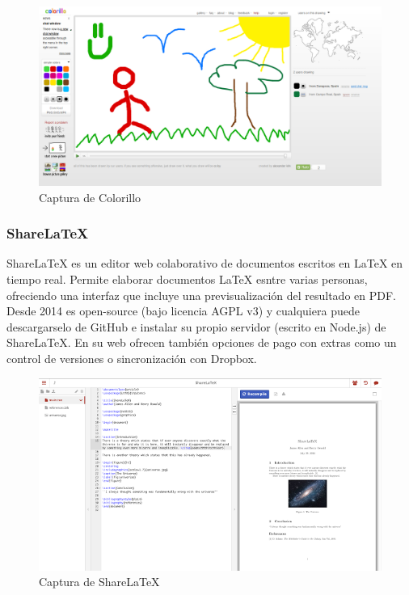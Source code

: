 	\begin{figure}[H]
		\centering
			\includegraphics[keepaspectratio, scale=0.30]{Media/Captures/colorilloWeb.png}
		\caption{Captura de Colorillo}
		\label{fig:colorillo}
	\end{figure}  	
	
	\subsubsection{ShareLaTeX}
	
	ShareLaTeX \cite{ref:shareLatex} es un editor web colaborativo de documentos escritos en LaTeX en tiempo real. Permite elaborar documentos LaTeX esntre varias personas, ofreciendo una interfaz que incluye una previsualización del resultado en PDF. Desde 2014 es open-source (bajo licencia AGPL v3) y cualquiera puede descargarselo de GitHub e instalar su propio servidor (escrito en Node.js) de ShareLaTeX. En su web ofrecen también opciones de pago con extras como un control de versiones o sincronización con Dropbox.
	
	\begin{figure}[H]
		\centering
			\includegraphics[keepaspectratio, scale=0.60]{Media/Captures/shareLatexWeb.png}
		\caption{Captura de ShareLaTeX}
		\label{fig:shareLaTeX}
	\end{figure}  
		

